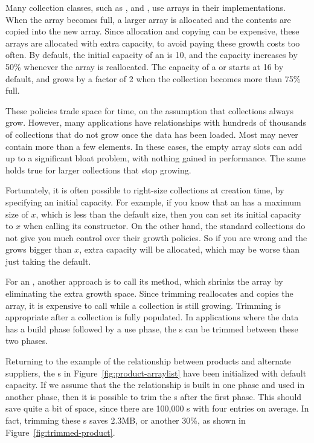 Many collection classes, such as ,  and
, use arrays in their implementations. When the array becomes
full, a larger array is allocated and the contents are copied into the new array.
Since allocation and copying can be expensive, these arrays are
allocated with extra capacity, to avoid paying these growth costs too
often. 
By default, the initial capacity of an  is 10, and the capacity
increases by 50\% whenever the array is reallocated.
The capacity of a  or 
starts at 16 by default, and grows by a factor of 2 when the collection becomes
more than 75\% full.

These policies trade space
for time, on the assumption that collections always grow.
However, many applications have relationships with
hundreds of thousands of collections that do not grow once the data has
been loaded. Most may never contain more than a few elements. 
In these cases, the empty array slots can add up to a
significant bloat problem, with nothing gained in performance. 
The same holds true for larger collections that stop growing. 

Fortunately, it is often possible to right-size collections at creation
time, by specifying an initial capacity. For example, if you know that an
 has a maximum size of $x$, which is less than the default
size, then you can set its initial capacity to $x$ when calling its constructor. On the
other hand, the standard collections do not give you much control over their
growth policies. So if you are wrong and the  grows bigger than
$x$, extra capacity will be allocated, which may be worse than just taking the
default. 
 
For an , another approach is to call its 
method, which shrinks the array by eliminating the extra growth space. 
Since trimming reallocates and copies the array, it is expensive to call
 while a collection is still growing. Trimming is
appropriate after a collection is fully populated. In 
applications where the data has a build phase followed by a use phase,
the s can be trimmed between these two phases.
 
Returning to the example of the relationship between products and alternate
suppliers, the s in Figure~\ref{fig:product-arraylist} have
been initialized with default capacity. If we assume that the the relationship
is built in one phase and used in another phase, then it is possible to trim the
s after the first phase. This should save quite a bit of
space, since there are 100,000 s with four entries on
average. In fact, trimming these
s saves 2.3MB, or another 30\%, as shown in
Figure~\ref{fig:trimmed-product}. 

